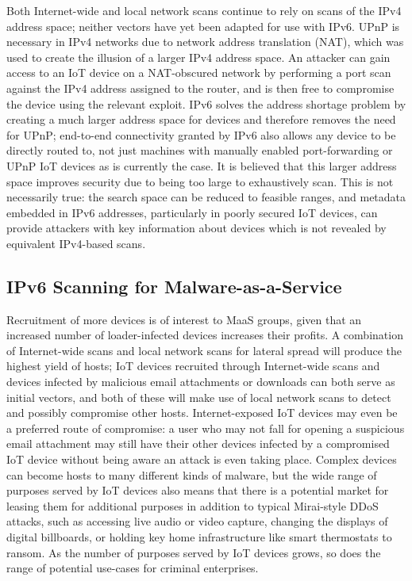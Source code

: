 \documentclass[10pt,sigconf]{acmart}
\begin{document}
Both Internet-wide and local network scans continue to rely on scans of the IPv4 address space;
neither vectors have yet been adapted for use with IPv6.
UPnP is necessary in IPv4 networks due to network address translation (NAT), which was used to create the illusion of a larger IPv4 address space.
An attacker can gain access to an IoT device on a NAT-obscured network by performing a port scan against the IPv4 address assigned to the router, and is then free to compromise the device using the relevant exploit.
IPv6 solves the address shortage problem by creating a much larger address space for devices and therefore removes the need for UPnP;
end-to-end connectivity granted by IPv6 also allows any device to be directly routed to, not just machines with manually enabled port-forwarding or UPnP IoT devices as is currently the case.
It is believed that this larger address space improves security due to being too large to exhaustively scan.
This is not necessarily true:
the search space can be reduced to feasible ranges, and metadata embedded in IPv6 addresses, particularly in poorly secured IoT devices, can provide attackers with key information about devices which is not revealed by equivalent IPv4-based scans.

\subsection{IPv6 Scanning for Malware-as-a-Service}

Recruitment of more devices is of interest to MaaS groups, given that an increased number of loader-infected devices increases their profits.
A combination of Internet-wide scans and local network scans for lateral spread will produce the highest yield of hosts;
IoT devices recruited through Internet-wide scans and devices infected by malicious email attachments or downloads can both serve as initial vectors, and both of these will make use of local network scans to detect and possibly compromise other hosts.
Internet-exposed IoT devices may even be a preferred route of compromise:
a user who may not fall for opening a suspicious email attachment may still have their other devices infected by a compromised IoT device without being aware an attack is even taking place.
Complex devices can become hosts to many different kinds of malware, but the wide range of purposes served by IoT devices also means that there is a potential market for leasing them for additional purposes in addition to typical Mirai-style DDoS attacks, such as accessing live audio or video capture, changing the displays of digital billboards, or holding key home infrastructure like smart thermostats to ransom.
As the number of purposes served by IoT devices grows, so does the range of potential use-cases for criminal enterprises.
\end{document}
